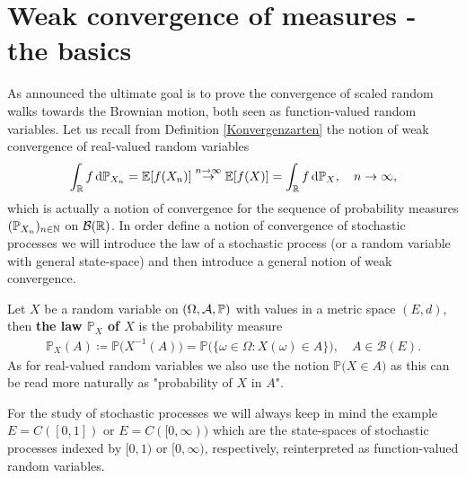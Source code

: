 \section{Weak convergence of measures - the basics }
As announced the ultimate goal is to prove the convergence of scaled random walks towards the Brownian motion, both seen as function-valued random variables. Let us recall from Definition \ref{Konvergenzarten} the notion of weak convergence of real-valued random variables
\begin{align}\label{weakk}
	\int_{\mathbb{R}} f \, \mathrm{d} \mathbb P_{X_n}=\mathbb{E}[f(X_n)]\overset{n\to\infty}{\rightarrow} \mathbb{E}[f(X)]=\int_{\mathbb{R}} f \, \mathrm{d} \mathbb P_X,\quad n\to\infty,
\end{align}
which is actually a notion of convergence for the sequence of probability measures $(\mathbb P_{X_n})_{n\in\mathbb{N}}$ on $\mathcal B(\mathbb{R})$. In order define a notion of convergence of stochastic processes we will introduce the law of a stochastic process (or a random variable with general state-space) and then introduce a general notion of weak convergence. 
\begin{ldef}
\begin{deff}
	Let $X$ be a random variable on $(\Omega,\mathcal{A},\mathbb{P})$ with values in a metric space $(E,d)$, then \textbf{the law $\mathbb{P}_X$ of $X$} is the probability measure
	\begin{align*}
		\mathbb{P}_X (A) \coloneqq \mathbb{P}\big( X^{-1}(A) \big)= \mathbb{P}\big( \{ \omega \in \Omega \colon  X(\omega) \in A \} \big),\quad A\in \mathcal B(E).
	\end{align*}
	As for real-valued random variables we also use the notion $\mathbb{P}\big( X\in A \big)$ as this can be read more naturally as "{}probability of $X$ in $A$".
\end{deff}
\end{ldef}
For the study of stochastic processes we will always keep in mind the example $E=C([0,1])$ or $E=C([0,\infty))$ which are the state-spaces of stochastic processes indexed by $[0,1)$ or $[0,\infty)$, respectively, reinterpreted as function-valued random variables.\smallskip


